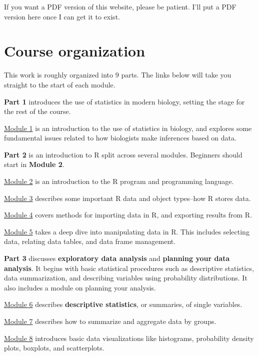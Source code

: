 \documentclass[
  13,
  letterpaper,
]{report}
\begin{document}
If you want a PDF version of this website, please be patient. I'll put a
PDF version here once I can get it to exist.

\section*{Course organization}\label{course-organization}


This work is roughly organized into 9 parts. The links below will take
you straight to the start of each module.

\textbf{Part 1} introduces the use of statistics in modern biology,
setting the stage for the rest of the course.

\hyperref[sec-intro]{Module 1} is an introduction to the use of
statistics in biology, and explores some fundamental issues related to
how biologists make inferences based on data.

\textbf{Part 2} is an introduction to R split across several modules.
Beginners should start in \textbf{Module 2}.

\hyperref[sec-r]{Module 2} is an introduction to the R program and
programming language.

\hyperref[sec-data]{Module 3} describes some important R data and object
types--how R stores data.

\hyperref[sec-ie]{Module 4} covers methods for importing data in R, and
exporting results from R.

\hyperref[sec-manip]{Module 5} takes a deep dive into manipulating data
in R. This includes selecting data, relating data tables, and data frame
management.

\textbf{Part 3} discusses \textbf{exploratory data analysis} and
\textbf{planning your data analysis}. It begins with basic statistical
procedures such as descriptive statistics, data summarization, and
describing variables using probability distributions. It also includes a
module on planning your analysis.

\hyperref[sec-desc]{Module 6} describes \textbf{descriptive statistics},
or summaries, of single variables.

\hyperref[sec-summ]{Module 7} describes how to summarize and aggregate
data by groups.

\hyperref[sec-plot1]{Module 8} introduces basic data visualizations like
histograms, probability density plots, boxplots, and scatterplots.
\end{document}
